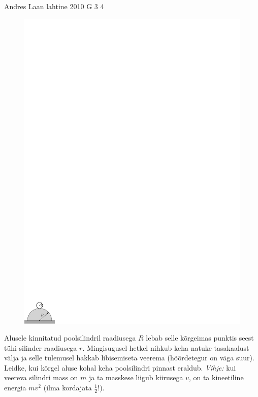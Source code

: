 \documentclass[11pt, twoside]{article}
\begin{document}
{%
{Andres Laan} %
{lahtine} %
{2010} %
{G 3} %
{4} %
{
\ifStatement
\begin{figure}
	\vspace{-10pt}
	\hspace{-8pt}
	\includegraphics[width=\linewidth]{2010-lahg-03-silindri_joonis_ipe}
\end{figure}

Alusele kinnitatud poolsilindril raadiusega $R$
lebab selle kõrgeimas punktis seest tühi silinder
raadiusega $r$. Mingisugusel hetkel nihkub keha natuke tasakaalust välja ja
selle tulemusel hakkab libisemiseta veerema (hõõrdetegur on väga suur). Leidke, kui kõrgel aluse kohal keha
poolsilindri pinnast eraldub. \emph{Vihje:} kui veereva silindri mass on $m$ ja
ta masskese liigub kiirusega $v$, on ta kineetiline energia $m v^2$ (ilma
kordajata $\frac12$!).
\fi
}

}
\end{document}
